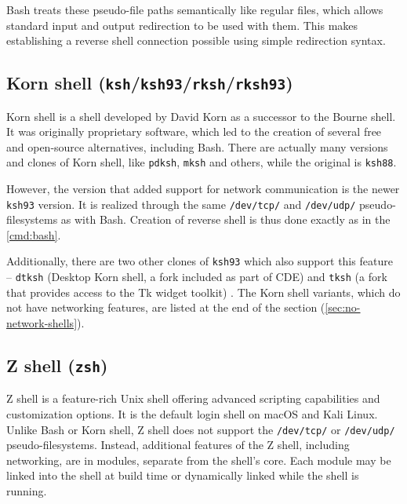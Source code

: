 Bash treats these pseudo-file paths semantically like regular files, which allows standard input and output redirection to be used with them. This makes establishing a reverse shell connection possible using simple redirection syntax.



\subsection{Korn shell (\texttt{ksh}/\texttt{ksh93}/\texttt{rksh}/\texttt{rksh93})}


Korn shell is a shell developed by David Korn as a successor to the Bourne shell. It was originally proprietary software, which led to the creation of several free and open-source alternatives, including Bash. There are actually many versions and clones of Korn shell, like \texttt{pdksh}, \texttt{mksh} and others, while the original is \texttt{ksh88}.

However, the version that added support for network communication is the newer \texttt{ksh93} version. It is realized through the same \texttt{/dev/tcp/} and \texttt{/dev/udp/} pseudo-filesystems as with Bash. Creation of reverse shell is thus done exactly as in the \cref{cmd:bash}.


Additionally, there are two other clones of \texttt{ksh93} which also support this feature -- \texttt{dtksh} (Desktop Korn shell, a fork included as part of CDE) and \texttt{tksh} (a fork that provides access to the Tk widget toolkit) \cite{kornshell-wiki}. The Korn shell variants, which do not have networking features, are listed at the end of the section (\cref{sec:no-network-shells}).

\subsection{Z shell (\texttt{zsh})}


Z shell is a feature-rich Unix shell offering advanced scripting capabilities and customization options. It is the default login shell on macOS and Kali Linux. Unlike Bash or Korn shell, Z shell does not support the \texttt{/dev/tcp/} or \texttt{/dev/udp/} pseudo-filesystems. Instead, additional features of the Z shell, including networking, are in modules, separate from the shell's core. Each module may be linked into the shell at build time or dynamically linked while the shell is running. \cite{zshmodules-man}

